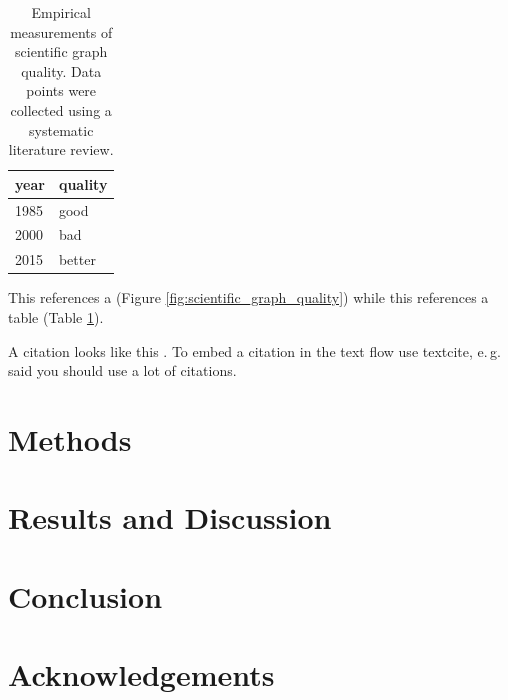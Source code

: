 \documentclass[11pt,
  paper=a4,
  bibliography=totocnumbered,
	captions=tableheading,
	BCOR=10mm
]{scrreprt}
\theoremstyle{definition}
\newcommand{\eg}{e.\,g.~}
\newcommand{\figref}[1]{(Figure \ref{#1})}
\newcommand{\tabref}[1]{(Table \ref{#1})}
\begin{document}
\begin{table}[H]
	\begin{tabular}{@{}ll@{}}
		\toprule
		year & quality \\ \midrule
		1985 & good    \\
		2000 & bad     \\ \midrule
		2015 & better  \\ \bottomrule
	\end{tabular}
	\caption{
		Empirical measurements of scientific graph quality. Data points were collected using
		a systematic literature review.\label{tab:scientific_graph_quality}}
\end{table}

This references a \figref{fig:scientific_graph_quality} while this references a table \tabref{tab:scientific_graph_quality}.

A citation looks like this \cite{Colombo2017}. To embed a citation in the text flow use textcite,
\eg \textcite{Friston2012} said you should use a lot of citations.

\chapter{Methods}



\chapter{Results and Discussion}


\chapter{Conclusion}


\chapter*{Acknowledgements}






\glsaddall
\printglossaries

\printbibliography
\end{document}

